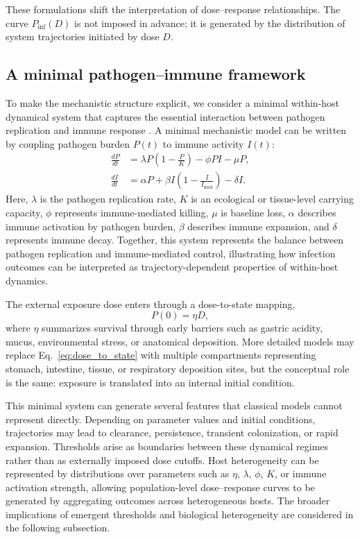 \documentclass[11pt]{article}
\begin{document}
These formulations shift the interpretation of dose--response relationships. The curve $P_{\mathrm{inf}}(D)$ is not imposed in advance; it is generated by the distribution of system trajectories initiated by dose $D$.

\subsection{A minimal pathogen--immune framework}\label{path_immune_frame}

To make the mechanistic structure explicit, we consider a minimal within-host dynamical system that captures the essential interaction between pathogen replication and immune response \cite{Mideo2008WithinHost,Murray2002MathematicalBiology1,Perelson2002ModellingViral}. A minimal mechanistic model can be written by coupling pathogen burden $P(t)$ to immune activity $I(t)$:
\begin{align}
\frac{dP}{dt}
&=
\lambda P\left(1-\frac{P}{K}\right)
-\phi PI
-\mu P,
\label{eq:pathogen_dynamics}
\\
\frac{dI}{dt}
&=
\alpha P
+
\beta I\left(1-\frac{I}{I_{\max}}\right)
-\delta I .
\label{eq:immune_dynamics}
\end{align}
Here, $\lambda$ is the pathogen replication rate, $K$ is an ecological or tissue-level carrying capacity, $\phi$ represents immune-mediated killing, $\mu$ is baseline loss, $\alpha$ describes immune activation by pathogen burden, $\beta$ describes immune expansion, and $\delta$ represents immune decay. Together, this system represents the balance between pathogen replication and immune-mediated control, illustrating how infection outcomes can be interpreted as trajectory-dependent properties of within-host dynamics.

The external exposure dose enters through a dose-to-state mapping,
\begin{equation}
P(0)=\eta D,
\label{eq:dose_to_state}
\end{equation}
where $\eta$ summarizes survival through early barriers such as gastric acidity, mucus, environmental stress, or anatomical deposition. More detailed models may replace Eq.~\eqref{eq:dose_to_state} with multiple compartments representing stomach, intestine, tissue, or respiratory deposition sites, but the conceptual role is the same: exposure is translated into an internal initial condition.


This minimal system can generate several features that classical models cannot represent directly. Depending on parameter values and initial conditions, trajectories may lead to clearance, persistence, transient colonization, or rapid expansion. Thresholds arise as boundaries between these dynamical regimes rather than as externally imposed dose cutoffs. Host heterogeneity can be represented by distributions over parameters such as $\eta$, $\lambda$, $\phi$, $K$, or immune activation strength, allowing population-level dose--response curves to be generated by aggregating outcomes across heterogeneous hosts. The broader implications of emergent thresholds and biological heterogeneity are considered in the following subsection.
\end{document}
